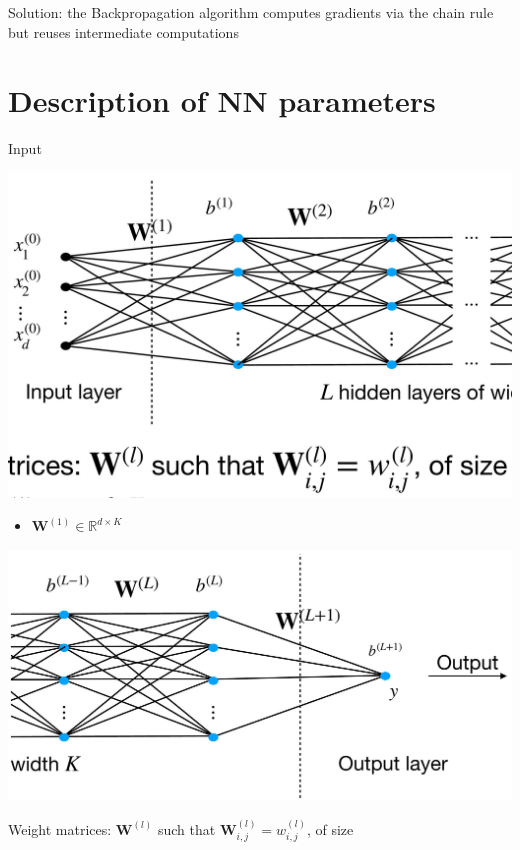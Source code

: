 \documentclass[10pt]{article}
\begin{document}
Solution: the Backpropagation algorithm computes gradients via the chain rule but reuses intermediate computations

\section*{Description of NN parameters}
Input

\begin{center}
\includegraphics[max width=\textwidth]{2023_12_30_360102aa01a03e5a4270g-10(1)}
\end{center}

\begin{itemize}
  \item $\mathbf{W}^{(1)} \in \mathbb{R}^{d \times K}$
\end{itemize}

\begin{center}
\includegraphics[max width=\textwidth]{2023_12_30_360102aa01a03e5a4270g-10}
\end{center}

Weight matrices: $\mathbf{W}^{(l)}$ such that $\mathbf{W}_{i, j}^{(l)}=w_{i, j}^{(l)}$, of size
\end{document}
